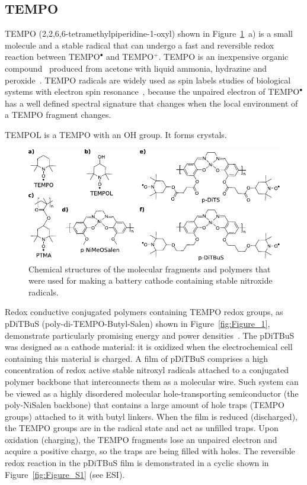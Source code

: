\par
\subsection{TEMPO}
TEMPO (2,2,6,6-tetramethylpiperidine-1-oxyl) shown in Figure~\ref{fig:molecules}~a) is a small molecule and a stable radical that can undergo a fast and reversible redox reaction between TEMPO$^\bullet$ and TEMPO$^+$. TEMPO is an inexpensive organic compound~\cite{Vereshchagin2022} produced from acetone with liquid ammonia, hydrazine and peroxide~\cite{Casado_2021_book}. TEMPO radicals are widely used as spin labels studies of biological systems with electron spin resonance~\cite{emagres}, because the unpaired electron of TEMPO$^\bullet$ has a well defined spectral signature that changes when the local environment of a TEMPO fragment changes.

TEMPOL is a TEMPO with an OH group. It forms crystals.

\begin{figure}[h]
\center
	\includegraphics[width=1\textwidth]{./electrochemistry/figures/materials/molecules.pdf}
	\caption{Chemical structures of the molecular fragments and polymers that were used for making a battery cathode containing stable nitroxide radicals.}
	\label{fig:molecules}
\end{figure}



Redox conductive conjugated polymers containing TEMPO redox groups, as pDiTBuS (poly-di-TEMPO-Butyl-Salen) shown in Figure~\ref{fig:Figure_1}, demonstrate particularly promising energy and power densities~\cite{Vereshchagin2020}. The pDiTBuS was designed as a cathode material: it is oxidized when the electrochemical cell containing this material is charged. A film of pDiTBuS comprises a high concentration of redox active stable nitroxyl radicals attached to a conjugated polymer backbone that interconnects them as a molecular wire. Such system can be viewed as a highly disordered molecular hole-transporting semiconductor (the poly-NiSalen backbone) that contains a large amount of hole traps (TEMPO groups) attached to it with butyl linkers. When the film is reduced (discharged), the TEMPO groups are in the radical state and act as unfilled traps. Upon oxidation (charging), the TEMPO fragments lose an unpaired electron and acquire a positive charge, so the traps are being filled with holes. The reversible redox reaction in the pDiTBuS film is demonstrated in a cyclic  shown in Figure~\ref{fig:Figure_S1} (see ESI).

